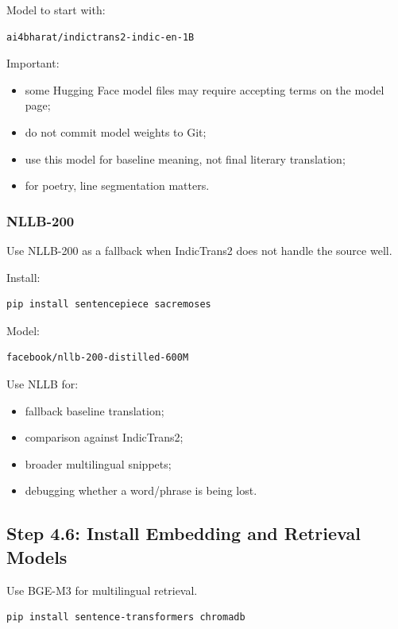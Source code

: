 \documentclass[11pt]{article}
\begin{document}
Model to start with:

\begin{verbatim}
ai4bharat/indictrans2-indic-en-1B
\end{verbatim}

Important:

\begin{itemize}
  \item some Hugging Face model files may require accepting terms on the model
  page;
  \item do not commit model weights to Git;
  \item use this model for baseline meaning, not final literary translation;
  \item for poetry, line segmentation matters.
\end{itemize}

\subsubsection{NLLB-200}

Use NLLB-200 as a fallback when IndicTrans2 does not handle the source well.

Install:

\begin{verbatim}
pip install sentencepiece sacremoses
\end{verbatim}

Model:

\begin{verbatim}
facebook/nllb-200-distilled-600M
\end{verbatim}

Use NLLB for:

\begin{itemize}
  \item fallback baseline translation;
  \item comparison against IndicTrans2;
  \item broader multilingual snippets;
  \item debugging whether a word/phrase is being lost.
\end{itemize}

\subsection{Step 4.6: Install Embedding and Retrieval Models}

Use BGE-M3 for multilingual retrieval.

\begin{verbatim}
pip install sentence-transformers chromadb
\end{verbatim}
\end{document}
